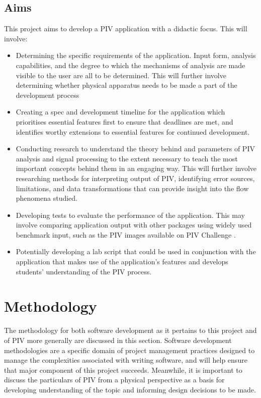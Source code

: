 \documentclass[12pt, a4paper]{amsart}
\begin{document}
\subsection{Aims}
This project aims to develop a PIV application with a didactic focus. This will involve:
\begin{itemize}
	\item Determining the specific requirements of the application. Input form, analysis capabilities, and the degree to which the mechanisms of analysis are made visible to the user are all to be determined. This will further involve determining whether physical apparatus needs to be made a part of the development process
	\item Creating a spec and development timeline for the application which prioritises essential features first to ensure that deadlines are met, and identifies worthy extensions to essential features for continued development.
	\item Conducting research to understand the theory behind and parameters of PIV analysis and signal processing to the extent necessary to teach the most important concepts behind them in an engaging way.  This will further involve researching methods for interpreting output of PIV, identifying error sources, limitations, and data transformations that can provide insight into the flow phenomena studied.
	\item Developing tests to evaluate the performance of the application. This may involve comparing application output with other packages using widely used benchmark input, such as the PIV images available on PIV Challenge \citep{pivchallenge}.
	\item Potentially developing a lab script that could be used in conjunction with the application that makes use of the application's features and develops students' understanding of the PIV process. 
\end{itemize}


\section{Methodology}
The methodology for both software development as it pertains to this project and of PIV more generally are discussed in this section.  Software development methodologies are a specific domain of project management practices designed to manage the complexities associated with writing software, and will help ensure that major component of this project succeeds. Meanwhile, it is important to discuss the particulars of PIV from a physical perspective as a basis for developing understanding of the topic and informing design decisions to be made. 
\end{document}
